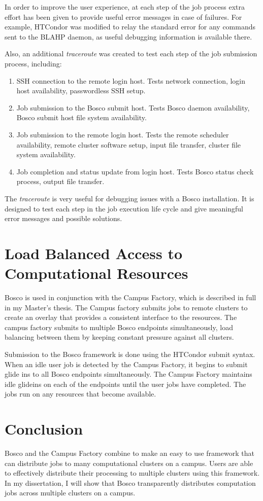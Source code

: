 In order to improve the user experience, at each step of the job process extra effort has been given to provide useful error messages in case of failures.  For example, HTCondor was modified to relay the standard error for any commands sent to the BLAHP daemon, as useful debugging information is available there.  

Also, an additional \emph{traceroute} was created to test each step of the job submission process, including:

\begin{enumerate}
\item SSH connection to the remote login host.  Tests network connection, login host availability, passwordless SSH setup.
\item Job submission to the Bosco submit host.  Tests Bosco daemon availability, Bosco submit host file system availability.
\item Job submission to the remote login host.  Tests the remote scheduler availability, remote cluster software setup, input file transfer, cluster file system availability.
\item Job completion and status update from login host.  Tests Bosco status check process, output file transfer.
\end{enumerate}

The \emph{traceroute} is very useful for debugging issues with a Bosco installation.  It is designed to test each step in the job execution life cycle and give meaningful error messages and possible solutions.

\section{Load Balanced Access to Computational Resources}

Bosco is used in conjunction with the Campus Factory, which is described in full in my Master's thesis.  The Campus factory submits jobs to remote clusters to create an overlay that provides a consistent interface to the resources.  The campus factory submits to multiple Bosco endpoints simultaneously, load balancing between them by keeping constant pressure against all clusters.

Submission to the Bosco framework is done using the HTCondor submit syntax.  When an idle user job is detected by the Campus Factory, it begins to submit glide ins to all Bosco endpoints simultaneously.  The Campus Factory maintains idle glideins on each of the endpoints until the user jobs have completed.  The jobs run on any resources that become available.


\section{Conclusion}

Bosco and the Campus Factory combine to make an easy to use framework that can distribute jobs to many computational clusters on a campus.  Users are able to effectively distribute their processing to multiple clusters using this framework.  In my dissertation, I will show that Bosco transparently distributes computation jobs across multiple clusters on a campus.  

